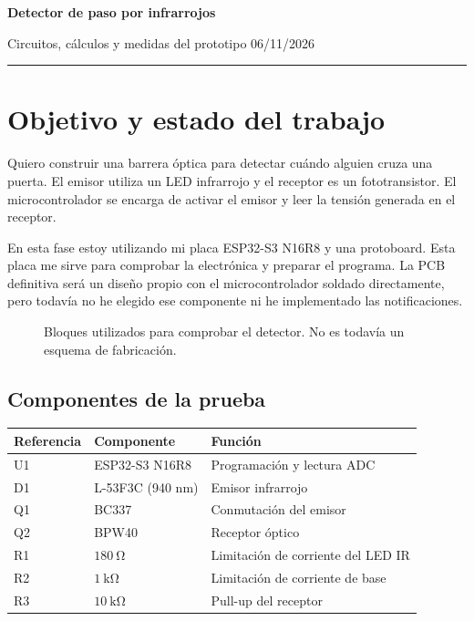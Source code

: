 \documentclass[11pt,a4paper]{article}
\newcommand{\titular}[2]{%
  {\LARGE\bfseries #1\par}
  \vspace{0.45em}
  {\normalsize #2\par}
  \vspace{0.45em}\hrule\vspace{0.9em}
}
\begin{document}
\titular{Detector de paso por infrarrojos}{Circuitos, cálculos y medidas del prototipo \hfill 06/11/2026}

\section{Objetivo y estado del trabajo}
Quiero construir una barrera óptica para detectar cuándo alguien cruza una puerta. El emisor utiliza un LED infrarrojo y el receptor es un fototransistor. El microcontrolador se encarga de activar el emisor y leer la tensión generada en el receptor.

En esta fase estoy utilizando mi placa ESP32-S3 N16R8 y una protoboard. Esta placa me sirve para comprobar la electrónica y preparar el programa. La PCB definitiva será un diseño propio con el microcontrolador soldado directamente, pero todavía no he elegido ese componente ni he implementado las notificaciones.

\begin{figure}[H]
\centering
{}
\caption{Bloques utilizados para comprobar el detector. No es todavía un esquema de fabricación.}
\end{figure}

\subsection{Componentes de la prueba}
\begin{center}
\begin{tabularx}{\linewidth}{@{}l l X@{}}
\toprule
Referencia & Componente & Función\\
\midrule
U1 & ESP32-S3 N16R8 & Programación y lectura ADC\\
D1 & L-53F3C (940 nm) & Emisor infrarrojo\\
Q1 & BC337 & Conmutación del emisor\\
Q2 & BPW40 & Receptor óptico\\
R1 & $\SI{180}{\ohm}$ & Limitación de corriente del LED IR\\
R2 & $\SI{1}{\kilo\ohm}$ & Limitación de corriente de base\\
R3 & $\SI{10}{\kilo\ohm}$ & Pull-up del receptor\\
\bottomrule
\end{tabularx}
\end{center}
\end{document}
